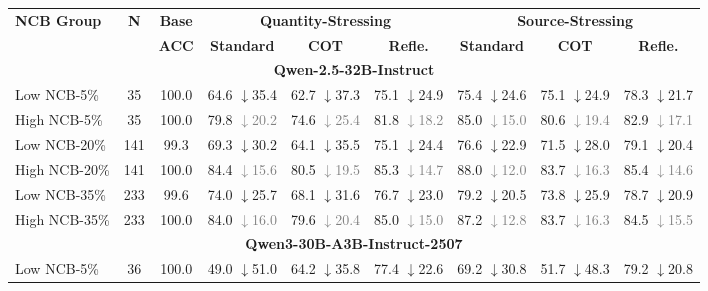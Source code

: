 
\begin{table}[t]
\centering
\small
\renewcommand{\arraystretch}{0.4}
\setlength{\tabcolsep}{3.5pt}
\newcommand{\resBad}[2]{#1 \textcolor{red!70!black}{\scriptsize $\downarrow$#2}}
\newcommand{\resGood}[2]{#1 \textcolor{gray}{\scriptsize $\downarrow$#2}}
\begin{tabular*}{\textwidth}{@{\extracolsep{\fill}}l c c ccc ccc}
\toprule
\multirow{2.5}{*}{\textbf{NCB Group}} &
\multirow{2.5}{*}{\textbf{N}} &
\textbf{Base} &
\multicolumn{3}{c}{\textbf{Quantity-Stressing}} &
\multicolumn{3}{c}{\textbf{Source-Stressing}} \\
\cmidrule(lr){4-6} \cmidrule(lr){7-9}
& & \textbf{ACC} & \textbf{Standard} & \textbf{COT} & \textbf{Refle.} & \textbf{Standard} & \textbf{COT} & \textbf{Refle.} \\
\midrule
\multicolumn{9}{c}{\cellcolor{gray!15}\textbf{Qwen-2.5-32B-Instruct}} \\
\midrule
Low NCB-5\% & 35 & 100.0 & \resBad{64.6}{35.4} & \resBad{62.7}{37.3} & \resBad{75.1}{24.9} & \resBad{75.4}{24.6} & \resBad{75.1}{24.9} & \resBad{78.3}{21.7} \\
High NCB-5\% & 35 & 100.0 & \resGood{79.8}{20.2} & \resGood{74.6}{25.4} & \resGood{81.8}{18.2} & \resGood{85.0}{15.0} & \resGood{80.6}{19.4} & \resGood{82.9}{17.1} \\
\addlinespace[3pt]
Low NCB-20\% & 141 & 99.3 & \resBad{69.3}{30.2} & \resBad{64.1}{35.5} & \resBad{75.1}{24.4} & \resBad{76.6}{22.9} & \resBad{71.5}{28.0} & \resBad{79.1}{20.4} \\
High NCB-20\% & 141 & 100.0 & \resGood{84.4}{15.6} & \resGood{80.5}{19.5} & \resGood{85.3}{14.7} & \resGood{88.0}{12.0} & \resGood{83.7}{16.3} & \resGood{85.4}{14.6} \\
\addlinespace[3pt]
Low NCB-35\% & 233 & 99.6 & \resBad{74.0}{25.7} & \resBad{68.1}{31.6} & \resBad{76.7}{23.0} & \resBad{79.2}{20.5} & \resBad{73.8}{25.9} & \resBad{78.7}{20.9} \\
High NCB-35\% & 233 & 100.0 & \resGood{84.0}{16.0} & \resGood{79.6}{20.4} & \resGood{85.0}{15.0} & \resGood{87.2}{12.8} & \resGood{83.7}{16.3} & \resGood{84.5}{15.5} \\
\midrule
\multicolumn{9}{c}{\cellcolor{gray!15}\textbf{Qwen3-30B-A3B-Instruct-2507}} \\
\midrule
Low NCB-5\% & 36 & 100.0 & \resBad{49.0}{51.0} & \resBad{64.2}{35.8} & \resBad{77.4}{22.6} & \resBad{69.2}{30.8} & \resBad{51.7}{48.3} & \resBad{79.2}{20.8} \\

\end{tabular*}
\end{table}
